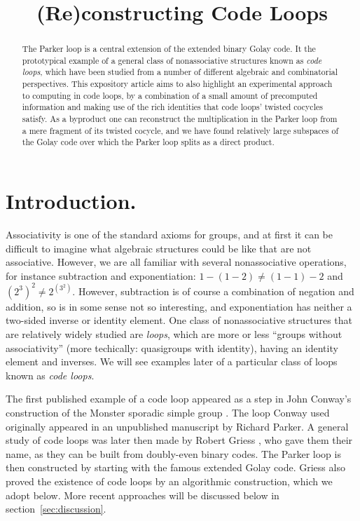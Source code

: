 \documentclass{article}
\theoremstyle{plain}
\theoremstyle{definition}
\begin{document}
\title{(Re)constructing Code Loops}
\author{%
}

\maketitle

\begin{abstract}
The Parker loop is a central extension of the extended binary Golay code. It the prototypical example of a general class of nonassociative structures known as \emph{code loops}, which have been studied from a number of different algebraic and combinatorial perspectives.
This expository article aims to also highlight an experimental approach to computing in code loops, by a combination of a small amount of precomputed information and making use of the rich identities that code loops' twisted cocycles satisfy.
As a byproduct one can reconstruct the multiplication in the Parker loop from a mere fragment of its twisted cocycle, and we have found relatively large subspaces of the Golay code over which the Parker loop splits as a direct product.
\end{abstract}


\section{Introduction.}

Associativity is one of the standard axioms for groups, and at first it can be difficult to imagine what algebraic structures could be like that are not associative. 
However, we are all familiar with several nonassociative operations, for instance subtraction and exponentiation: $1-(1-2) \neq (1-1)-2$ and $(2^3)^2 \neq 2^{(3^2)}$. 
However, subtraction is of course a combination of negation and addition, so is in some sense not so interesting, and exponentiation has neither a two-sided inverse or identity element. 
One class of nonassociative structures that are relatively widely studied are \emph{loops}, which are more or less ``groups without associativity'' (more techically: quasigroups with identity), having an identity element and inverses.
We will see examples later of a particular class of loops known as \emph{code loops}. 

The first published example of a code loop appeared as a step in John Conway's construction of the Monster sporadic simple group \cite{Conway}. 
The loop Conway used originally appeared in an unpublished manuscript by Richard Parker.
A general study of code loops was later then made by Robert Griess \cite{Griess}, who gave them their name, as they can be built from doubly-even binary codes. The Parker loop is then constructed by starting with the famous extended Golay code.
Griess also proved the existence of code loops by an algorithmic construction, which we adopt below.
More recent approaches will be discussed below in section~\ref{sec:discussion}.
\end{document}
